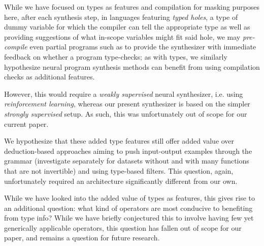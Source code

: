 \documentclass{article}
\begin{document}
    While we have focused on types as features and compilation for masking purposes here,
    after each synthesis step, in languages featuring \emph{typed holes},
    a type of dummy variable for which the compiler can tell the appropriate type
    as well as providing suggestions of what in-scope variables might fit said hole,
    we may \emph{pre-compile} even partial programs such as to provide the synthesizer with immediate feedback on whether a program type-checks;
    as with types, we similarly hypothesize neural program synthesis methods can benefit from using compilation checks as additional features.

    However, this would require a \emph{weakly supervised} neural synthesizer,
    i.e. using \emph{reinforcement learning},
    whereas our present synthesizer is based on the simpler \emph{strongly supervised} setup.
    As such, this was unfortunately out of scope for our current paper.

    We hypothesize that these added type features still offer added value over
    deduction-based approaches aiming to push input-output examples through the grammar
    (investigate separately for datasets without and with many functions that are not invertible)
    and using type-based filters.
    This question, again, unfortunately required an architecture significantly different from our own.

    While we have looked into the added value of types as features,
    this gives rise to an additional question:
    what kind of operators are most conducive to benefiting from type info?
    While we have briefly conjectured this to involve having few yet generically applicable operators,
    this question has fallen out of scope for our paper,
    and remains a question for future research.


\end{document}
